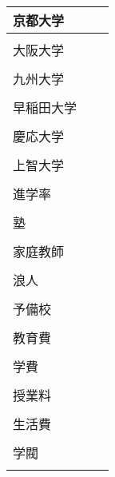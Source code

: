 \documentclass{article}
\begin{document}
\begin{tabular}{ l | p{6.7cm} | p{7.5cm} }
京都大学 & & \\ \hline \\[-1em]
大阪大学 & & \\ \hline \\[-1em]
九州大学 & & \\ \hline \\[-1em]
早稲田大学 & & \\ \hline \\[-1em]
慶応大学 & & \\ \hline \\[-1em]
上智大学 & & \\ \hline \\[-1em]
進学率 & & \\ \hline \\[-1em]
塾 & & \\ \hline \\[-1em]
家庭教師 & & \\ \hline \\[-1em]
浪人 & & \\ \hline \\[-1em]
予備校 & & \\ \hline \\[-1em]
教育費 & & \\ \hline \\[-1em]
学費  & & \\ \hline \\[-1em]
授業料 & & \\ \hline \\[-1em]
生活費 & & \\ \hline \\[-1em]
学閥 & & \\ \hline \\[-1em]
\end{tabular}
\end{document}

